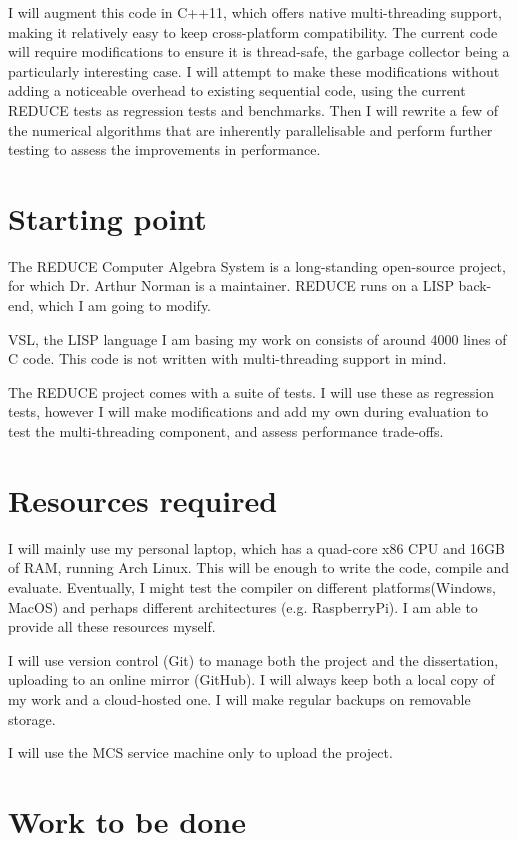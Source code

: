 \documentclass[12pt,a4paper,twoside]{article}
\begin{document}
I will augment this code in C++11, which offers native multi-threading support, making it
relatively easy to keep cross-platform compatibility. The current
code will require modifications to ensure it is thread-safe,
the garbage collector being a particularly interesting case.
I will attempt to make these modifications without adding a
noticeable overhead to existing sequential code, using the current
REDUCE tests as regression tests and benchmarks. Then I will rewrite
a few of the numerical algorithms that are inherently parallelisable
and perform further testing to assess the improvements in performance.

\section*{Starting point}

The REDUCE Computer Algebra System 
is a long-standing open-source
project, for which Dr. Arthur Norman is a maintainer. REDUCE runs on a
LISP back-end, which I am going to modify.

VSL,  the LISP language I am basing my work on consists of around 4000 lines of
C code. This code is not written with multi-threading support in mind. 

The REDUCE project comes with a suite of tests. I will use these as regression tests,
however I will make modifications and add my own during evaluation to test
the multi-threading component, and assess performance trade-offs.

\section*{Resources required}

I will mainly use my personal laptop, which has a quad-core x86 CPU
and 16GB of RAM, running Arch Linux. This will be enough to write the code, compile and evaluate.
Eventually, I might test the compiler on different platforms(Windows, MacOS) and perhaps
different architectures (e.g. RaspberryPi). I am able to provide all these resources myself. 

I will use version control (Git) to manage both the project and the dissertation, uploading
to an online mirror (GitHub). I will always keep both a local copy of my work and a cloud-hosted one. I will make regular backups on removable storage.

I will use the MCS service machine only to upload the project.

\section*{Work to be done}
\end{document}

